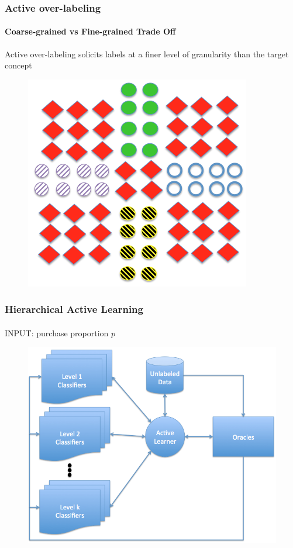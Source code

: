 \documentclass{beamer}
\begin{document}
\begin{frame}
    \frametitle{Active over-labeling}  %
    \framesubtitle{Coarse-grained vs Fine-grained Trade Off}
    \par Active over-labeling solicits labels at a finer level of granularity than the target concept
    \begin{figure}[!htb]
	\centering
    \includegraphics[width=0.6\columnwidth]{fig/union}
    \label{fig:union}
\end{figure}
\end{frame}
\begin{frame}
    \frametitle{Hierarchical Active Learning}  %
    \framesubtitle{}
    \par INPUT: purchase proportion $p$
    \begin{figure}[!htb]
        \centering
        \includegraphics[width=0.65\columnwidth]{fig/AL2}
        \label{fig:HALapproach}
    \end{figure}
\end{frame}
\end{document}

